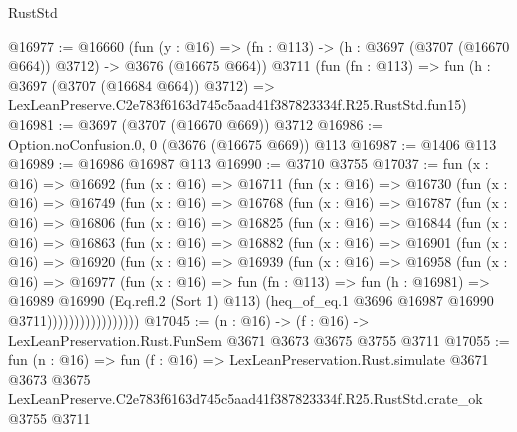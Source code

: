 \begin{lexlean}{RustStd}
\begin{coremodule}
@16977 := @16660
    (fun (y : @16) => (fn : @113) -> (h : @3697 (@3707 (@16670 @664)) @3712) -> @3676 (@16675 @664))
    @3711
    (fun (fn : @113) =>
    fun (h : @3697 (@3707 (@16684 @664)) @3712) =>
    LexLeanPreserve.C2e783f6163d745c5aad41f387823334f.R25.RustStd.fun15)
@16981 := @3697 (@3707 (@16670 @669)) @3712
@16986 := Option.noConfusion.{0, 0} (@3676 (@16675 @669)) @113
@16987 := @1406 @113
@16989 := @16986 @16987 @113
@16990 := @3710 @3755
@17037 := fun (x : @16) =>
  @16692
    (fun (x : @16) =>
    @16711
      (fun (x : @16) =>
      @16730
        (fun (x : @16) =>
        @16749
          (fun (x : @16) =>
          @16768
            (fun (x : @16) =>
            @16787
              (fun (x : @16) =>
              @16806
                (fun (x : @16) =>
                @16825
                  (fun (x : @16) =>
                  @16844
                    (fun (x : @16) =>
                    @16863
                      (fun (x : @16) =>
                      @16882
                        (fun (x : @16) =>
                        @16901
                          (fun (x : @16) =>
                          @16920
                            (fun (x : @16) =>
                            @16939
                              (fun (x : @16) =>
                              @16958
                                (fun (x : @16) =>
                                @16977
                                  (fun (x : @16) =>
                                  fun (fn : @113) =>
                                  fun (h : @16981) =>
                                  @16989
                                    @16990
                                    (Eq.refl.{2} (Sort 1) @113)
                                    (heq_of_eq.{1} @3696 @16987 @16990 @3711)))))))))))))))))
@17045 := (n : @16) -> (f : @16) -> LexLeanPreservation.Rust.FunSem @3671 @3673 @3675 @3755 @3711
@17055 := fun (n : @16) =>
  fun (f : @16) =>
  LexLeanPreservation.Rust.simulate
    @3671
    @3673
    @3675
    LexLeanPreserve.C2e783f6163d745c5aad41f387823334f.R25.RustStd.crate_ok
    @3755
    @3711
\end{coremodule}
\end{lexlean}
